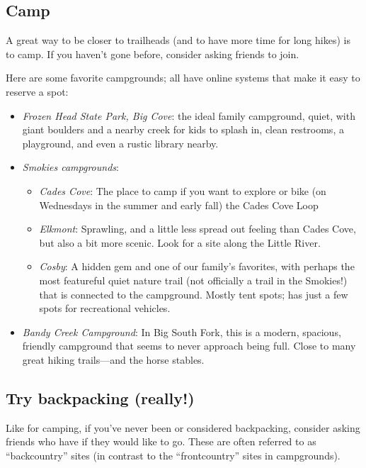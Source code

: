 \documentclass[
  letterpaper,
  DIV=11,
  numbers=noendperiod]{scrreprt}
\providecommand{\tightlist}{%
  \setlength{\itemsep}{0pt}\setlength{\parskip}{0pt}}\usepackage{longtable,booktabs,array}
\begin{document}
\subsection{Camp}\label{camp}

A great way to be closer to trailheads (and to have more time for long
hikes) is to camp. If you haven't gone before, consider asking friends
to join.

Here are some favorite campgrounds; all have online systems that make it
easy to reserve a spot:

\begin{itemize}
\tightlist
\item
  \emph{Frozen Head State Park, Big Cove}: the ideal family campground,
  quiet, with giant boulders and a nearby creek for kids to splash in,
  clean restrooms, a playground, and even a rustic library nearby.
\item
  \emph{Smokies campgrounds}:

  \begin{itemize}
  \tightlist
  \item
    \emph{Cades Cove}: The place to camp if you want to explore or bike
    (on Wednesdays in the summer and early fall) the Cades Cove Loop
  \item
    \emph{Elkmont}: Sprawling, and a little less spread out feeling than
    Cades Cove, but also a bit more scenic. Look for a site along the
    Little River.
  \item
    \emph{Cosby}: A hidden gem and one of our family's favorites, with
    perhaps the most featureful quiet nature trail (not officially a
    trail in the Smokies!) that is connected to the campground. Mostly
    tent spots; has just a few spots for recreational vehicles.
  \end{itemize}
\item
  \emph{Bandy Creek Campground}: In Big South Fork, this is a modern,
  spacious, friendly campground that seems to never approach being full.
  Close to many great hiking trails---and the horse stables.
\end{itemize}

\subsection{Try backpacking (really!)}\label{try-backpacking-really}

Like for camping, if you've never been or considered backpacking,
consider asking friends who have if they would like to go. These are
often referred to as ``backcountry'' sites (in contrast to the
``frontcountry'' sites in campgrounds).
\end{document}
